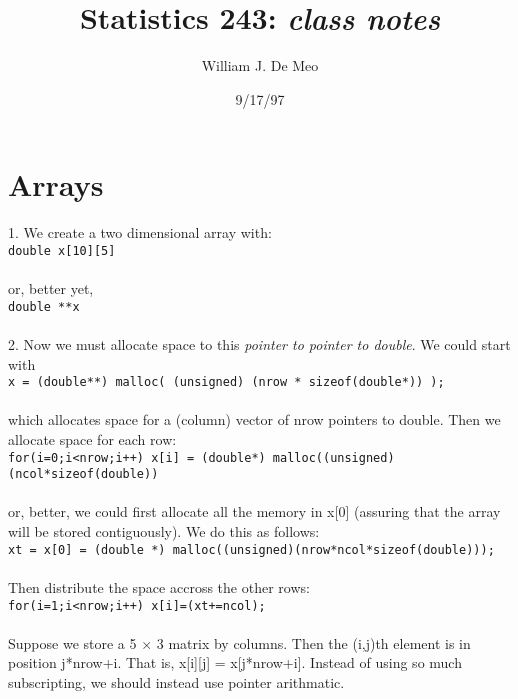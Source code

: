 \documentclass{article}
\begin{document}
\title{Statistics 243: \emph{class notes}}
\author{William J. De Meo}
\date{9/17/97}
\maketitle

\section{Arrays}
1.  We create a two dimensional array with:\\

{\tt double x[10][5]}\\
\\
or, better yet,\\

{\tt double **x}\\\\
2.  Now we must allocate space to this \emph{pointer to pointer to
  double}.  We could start with\\ 

{\tt x = (double**) malloc( (unsigned) (nrow * sizeof(double*)) );}\\
\\
which allocates space for a (column) vector of nrow pointers to
double.  Then we allocate space for each row:\\

{\tt for(i=0;i<nrow;i++) x[i] = (double*) malloc((unsigned)(ncol*sizeof(double))}\\
\\
or, better, we could first allocate all the memory in x[0] 
(assuring that the array will be stored contiguously).  We do this 
as follows:\\

{\tt xt = x[0] = (double *) malloc((unsigned)(nrow*ncol*sizeof(double)));}\\
\\
Then distribute the space accross the other rows:\\

{\tt for(i=1;i<nrow;i++) x[i]=(xt+=ncol);}\\
\\
Suppose we store a 5 $\times$ 3 matrix by columns.  Then the (i,j)th
element is in position j*nrow+i.  That is, x[i][j] = x[j*nrow+i].  
Instead of using so much subscripting, we should instead use pointer
arithmatic.
\end{document}
